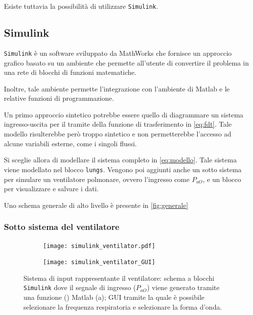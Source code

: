 Esiste tuttavia la possibilità di utilizzare  \texttt{Simulink}. 

\subsection{Simulink}


 \texttt{Simulink} \cite{simulink} è un software sviluppato da MathWorks che fornisce un approccio grafico basato su un ambiente che permette all'utente di convertire il problema in una rete di blocchi di funzioni matematiche. 

Inoltre, tale ambiente permette l'integrazione con l'ambiente di Matlab e le relative funzioni di programmazione. 

Un primo approccio sintetico potrebbe essere quello di diagrammare un sistema ingresso-uscita per il tramite della funzione di trasferimento in \cref{eq:fdt}. Tale modello risulterebbe però troppo sintetico e non permetterebbe l'accesso ad alcune variabili esterne, come i singoli flussi.

Si sceglie allora di modellare il sistema completo in \cref{eq:modello}. Tale sistema viene modellato nel blocco \texttt{lungs}. Vengono poi aggiunti anche un sotto sistema per simulare un ventilatore polmonare, ovvero l'ingresso come $P_{aO}$, e un blocco per visualizzare e salvare i dati.

Uno schema generale di alto livello è presente in \cref{fig:generale}


\subsubsection{Sotto sistema del ventilatore}


\begin{figure}[t!]
	\centering
	\begin{subfigure}{0.4\linewidth}
		\centering
		\texttt{[image: simulink\_ventilator.pdf]}
		\caption{}
	\end{subfigure}\hfill
	\begin{subfigure}{0.6\linewidth}
		\centering
		\texttt{[image: simulink\_ventilator\_GUI]}
		\caption{}
		\label{fig:mask}
	\end{subfigure}\hfill
	\caption{Sistema di input rappresentante il ventilatore: schema a blocchi  \texttt{Simulink} dove il segnale di ingresso ($P_{aO}$) viene generato tramite una funzione () Matlab (a); GUI tramite la quale è possibile selezionare la frequenza respiratoria e selezionare la forma d'onda.}
\end{figure}


